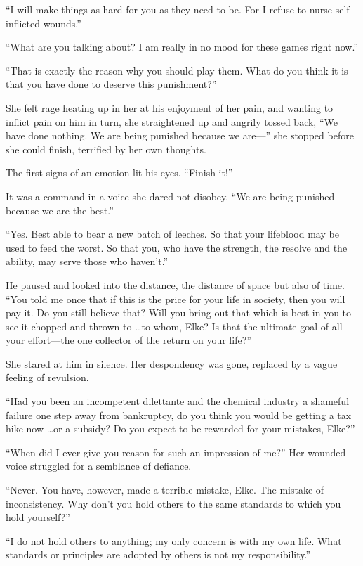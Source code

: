 ``I will make things as hard for you as they need to be. For I refuse to nurse self-inflicted wounds.''

``What are you talking about? I am really in no mood for these games right now.''

``That is exactly the reason why you should play them. What do you think it is that you have done to deserve this punishment?''

She felt rage heating up in her at his enjoyment of her pain, and wanting to inflict pain on him in turn, she straightened up and angrily tossed back, ``We have done nothing. We are being punished because we are---'' she stopped before she could finish, terrified by her own thoughts.

The first signs of an emotion lit his eyes. ``Finish it!''

It was a command in a voice she dared not disobey. ``We are being punished because we are the best.''

``Yes. Best able to bear a new batch of leeches. So that your lifeblood may be used to feed the worst. So that you, who have the strength, the resolve and the ability, may serve those who haven't.''

He paused and looked into the distance, the distance of space but also of time. ``You told me once that if this is the price for your life in society, then you will pay it. Do you still believe that? Will you bring out that which is best in you to see it chopped and thrown to \ldots to whom, Elke? Is that the ultimate goal of all your effort---the one collector of the return on your life?''

She stared at him in silence. Her despondency was gone, replaced by a vague feeling of revulsion.

``Had you been an incompetent dilettante and the chemical industry a shameful failure one step away from bankruptcy, do you think you would be getting a tax hike now \ldots or a subsidy? Do you expect to be rewarded for your mistakes, Elke?''

``When did I ever give you reason for such an impression of me?'' Her wounded voice struggled for a semblance of defiance.

``Never. You have, however, made a terrible mistake, Elke. The mistake of inconsistency. Why don't you hold others to the same standards to which you hold yourself?''

``I do not hold others to anything; my only concern is with my own life. What standards or principles are adopted by others is not my responsibility.''

